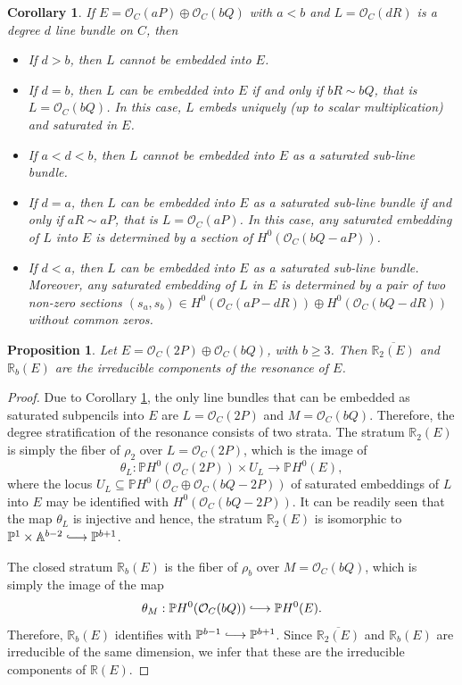 \documentclass[10pt,a4paper]{amsart}
\newtheorem{cor}{Corollary}
\newtheorem{prop}{Proposition}
\renewcommand{\a}[0]{{\mathbb A}}
\newcommand{\hooklongrightarrow}{\lhook\joinrel\longrightarrow}
\renewcommand{\o}[0]{{\mathcal O}}
\newcommand{\p}[0]{{\mathbb P}}
\renewcommand{\r}[0]{{\mathbb R}}
\begin{document}
\begin{cor} \label{cor:saturated_embeddings_a<b}
If $E = \o_C(aP) \oplus \o_C(bQ)$ with $a<b$ and $L = \o_C(dR)$ is a degree $d$ line bundle on $C$, then
\begin{itemize}
    \item [(a)] If $d > b$, then $L$ cannot be embedded into $E$.
    \item [(b)] If $d = b$, then $L$ can be embedded into $E$ if and only if $bR \sim bQ$, that is $L = \o_C(bQ)$. In this case, $L$ embeds uniquely (up to scalar multiplication) and saturated in $E$.
    \item [(c)] If $a < d < b$, then $L$ cannot be embedded into $E$ as a saturated sub-line bundle.
    \item [(d)] If $d = a$, then $L$ can be embedded into $E$ as a saturated sub-line bundle if and only if $aR \sim aP$, that is $L = \o_C(aP)$. In this case, any saturated embedding of $L$ into $E$ is determined by a section of $H^0(\o_C(bQ - aP))$.
    \item [(e)] If $d < a$, then $L$ can be embedded into $E$ as a saturated sub-line bundle. Moreover, any saturated embedding of $L$ in $E$ is determined by a pair of two non-zero sections $(s_a, s_b) \in H^0(\o_C(aP - dR)) \oplus H^0(\o_C(bQ - dR))$ without common zeros. 
\end{itemize}
\end{cor}

\begin{prop} \label{prop:2P_bQ}
Let $E = \o_C(2P) \oplus \o_C(bQ)$, with $b \ge 3$. Then $\overline{\r_2(E)}$ and $\r_b(E)$ are the irreducible components of the resonance of $E$.
\end{prop}

\begin{proof}
Due to Corollary \ref{cor:saturated_embeddings_a<b}, the only line bundles that can be embedded as saturated subpencils into $E$ are $L = \o_C(2P)$ and $M = \o_C(bQ)$. Therefore, the degree stratification of the resonance consists of two strata. The stratum $\r_2(E)$ is simply the fiber of $\rho_2$ over $L = \o_C(2P)$, which is the image of
\[
\theta_L : \p H^0(\o_C(2P)) \times U_L \longrightarrow \p H^0(E),
\]
where the locus $U_L \subseteq \p H^0(\o_C \oplus \o_C(bQ - 2P))$ of saturated embeddings of $L$ into $E$ may be identified with $H^0(\o_C(bQ - 2P))$. It can be readily seen that the map $\theta_L$ is injective and hence, the stratum $\r_2(E)$ is isomorphic to $\p^1 \times \a^{b-2} \hooklongrightarrow \p^{b+1}$.

The closed stratum $\r_b(E)$ is the fiber of $\rho_b$ over $M = \o_C(bQ)$, which is simply the image of the map
\[
\theta_M : \p H^0(\o_C(bQ)) \hooklongrightarrow \p H^0(E). 
\]
Therefore, $\r_b(E)$ identifies with $\p^{b-1} \hooklongrightarrow \p^{b+1}$. Since $\overline{\r_2(E)}$ and $\r_b(E)$ are irreducible of the same dimension, we infer that these are the irreducible components of $\r(E)$.
\end{proof}
\end{document}

